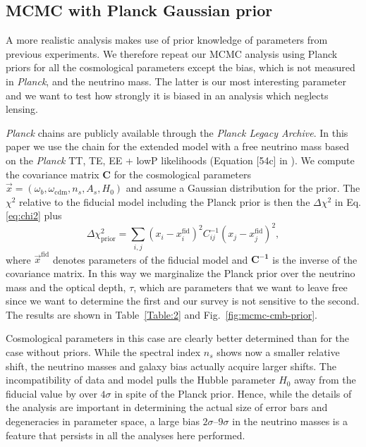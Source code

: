 \subsection{MCMC with Planck Gaussian prior}

A more realistic analysis makes use of prior knowledge of parameters from previous experiments. We therefore
repeat our MCMC analysis using Planck priors for all the cosmological parameters except the bias, which is not measured in {\it Planck}, and the neutrino mass. The latter is our most interesting parameter and we want to test how strongly it is biased in an analysis which neglects lensing.

{\it Planck} chains are publicly available through the \textit{Planck Legacy Archive}. In this paper we use the chain for the extended model with a free neutrino mass based on the {\it Planck} TT, TE, EE + lowP likelihoods (Equation [54c] in \cite{Ade:2015xua}). We compute the covariance matrix $\mathbf{C}$ for the cosmological parameters $\vec{x}=(\omega_b,\omega_{\mathrm{cdm}},n_s,A_s,H_0)$ and assume a Gaussian distribution for the prior. The $\chi^2$ relative to the fiducial model including the Planck prior is then the $\Delta \chi^2$ in Eq. \eqref{eq:chi2} plus
\begin{equation}
\Delta \chi^2_{\mathrm{prior}} = \sum_{i,j} (x_i - x^{\mathrm{fid}}_i)^2 C^{-1}_{ij} (x_j - x^{\mathrm{fid}}_j)^2,
\label{Eq:chi2-prior}
\end{equation}
where $\vec{x}^{\mathrm{fid}}$ denotes parameters of the fiducial model and $\mathbf{C^{-1}}$ is the inverse of the covariance matrix.
In this way we marginalize the Planck prior over the neutrino mass and the optical depth, $\tau$, which are parameters that we want to leave free since we want to determine the first and our survey is not sensitive to the second. The results are shown in Table~\ref{Table:2} and Fig.~\ref{fig:mcmc-cmb-prior}.


Cosmological parameters in this case are clearly better determined than for the case without priors.
While the spectral index $n_s$ shows now a smaller relative shift, the neutrino masses and galaxy bias actually acquire larger shifts.
The incompatibility of data and model pulls the Hubble parameter $H_0$ away from the fiducial value by over $4\sigma$ in spite of the Planck prior.
Hence, while the details of the analysis are important in determining the actual size of error bars and degeneracies in parameter space, a large bias $2\sigma$--$9\sigma$ in the neutrino masses is a feature that persists in all the analyses here performed.


